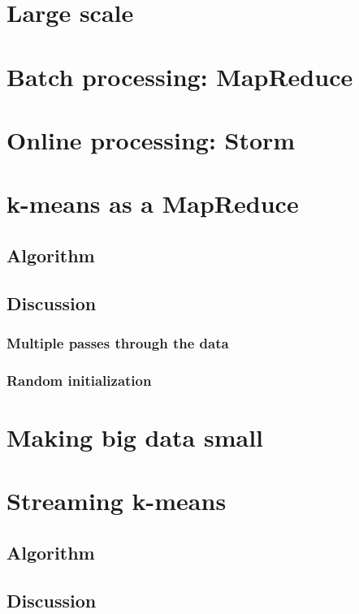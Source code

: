 \documentclass{article}
\begin{document}
\section{Large scale}

\section{Batch processing: MapReduce}

\section{Online processing: Storm}

\section{k-means as a MapReduce}

\subsection{Algorithm}

\subsection{Discussion}

\subsubsection{Multiple passes through the data}

\subsubsection{Random initialization}

\section{Making big data small}

\section{Streaming k-means}

\subsection{Algorithm}

\subsection{Discussion}
\end{document}
